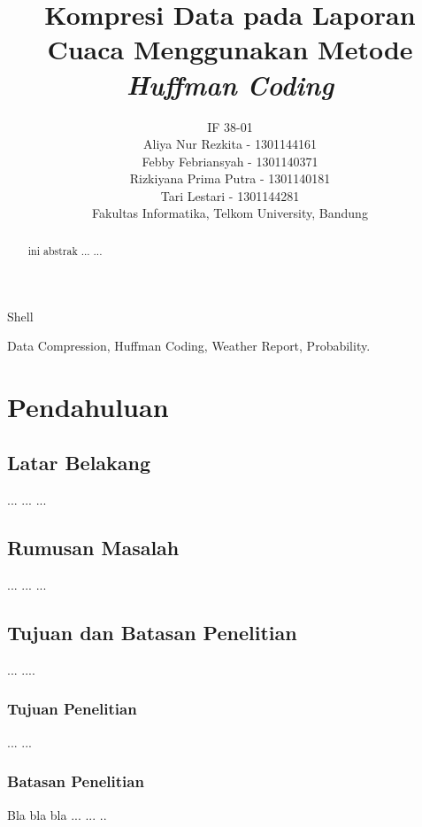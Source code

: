 \documentclass[journal]{IEEEtran}
\begin{document}
	
\title{Kompresi Data pada Laporan Cuaca Menggunakan Metode \textit{Huffman Coding}}

\author{
	IF 38-01\\
	Aliya Nur Rezkita - 1301144161\\
	Febby Febriansyah - 1301140371\\	
	Rizkiyana Prima Putra - 1301140181\\
	Tari Lestari - 1301144281\\
	Fakultas Informatika, Telkom University, Bandung
}

%
{Shell}

\maketitle

\begin{abstract}
	ini abstrak ... ...
\end{abstract}

\begin{IEEEkeywords}
Data Compression, Huffman Coding, Weather Report, Probability.
\end{IEEEkeywords}


\section{Pendahuluan}


\subsection{Latar Belakang}
... ... ...

\subsection{Rumusan Masalah}
... ... ...

\subsection{Tujuan dan Batasan Penelitian}
... ....

\subsubsection{Tujuan Penelitian}
... ...

\subsubsection{Batasan Penelitian}
Bla bla bla ... ... ..
\end{document}
